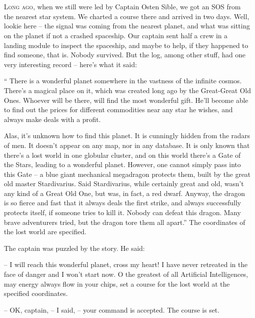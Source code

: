 \documentclass[ebook,oneside,final,openright]{memoir}
\begin{document}
\chapter{}
\par
\lettrine{L}{ong ago,} when we still were led by Captain Osten Sible, we got an SOS from the nearest star system. We charted a course there and arrived in two days. Well, lookie here – the signal was coming from the nearest planet, and what was sitting on the planet if not a crashed spaceship. Our captain sent half a crew in a landing module to inspect the spaceship, and maybe to help, if they happened to find someone, that is. Nobody survived. But the log, among other stuff, had one very interesting record – here’s what it said:\par
\par
“ There is a wonderful planet somewhere in the vastness of the infinite cosmos. There’s a magical place on it, which was created long ago by the Great-Great Old Ones. Whoever will be there, will find the most wonderful gift. He’ll become able to find out the prices for different commodities near any star he wishes, and always make deals with a profit. \par
Alas, it’s unknown how to find this planet. It is cunningly hidden from the radars of men. It doesn’t appear on any map, nor in any database. It is only known that there’s a lost world in one globular cluster, and on this world there’s a Gate of the Stars, leading to a wonderful planet. However, one cannot simply pass into this Gate – a blue giant mechanical megadragon protects them, built by the great old master Stardivarius. Said Stardivarius, while certainly great and old, wasn’t any kind of a Great Old One, but was, in fact, a red dwarf. Anyway, the dragon is so fierce and fast that it always deals the first strike, and always successfully protects itself, if someone tries to kill it. Nobody can defeat this dragon. Many brave adventurers tried, but the dragon tore them all apart.” The coordinates of the lost world are specified.\par
\par
The captain was puzzled by the story. He said:\par
– I will reach this wonderful planet, cross my heart! I have never retreated in the face of danger and I won’t start now. O the greatest of all Artificial Intelligences, may energy always flow in your chips, set a course for the lost world at the specified coordinates.\par
– OK, captain, – I said, – your command is accepted. The course is set.\par
\end{document}
